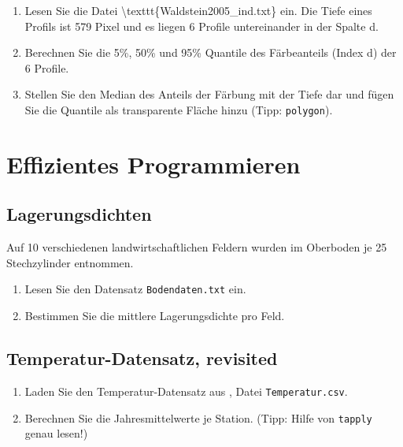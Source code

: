 \documentclass[]{book}
\providecommand{\tightlist}{%
  \setlength{\itemsep}{0pt}\setlength{\parskip}{0pt}}
\begin{document}
\begin{enumerate}
\def\labelenumi{\arabic{enumi}.}
\tightlist
\item
  Lesen Sie die Datei \textbackslash{}texttt\{Waldstein2005\_ind.txt\} ein. Die Tiefe eines Profils ist 579 Pixel und es liegen 6 Profile untereinander in der Spalte d.
\item
  Berechnen Sie die 5\%, 50\% und 95\% Quantile des Färbeanteils (Index d) der 6 Profile.
\item
  Stellen Sie den Median des Anteils der Färbung mit der Tiefe dar und fügen Sie die Quantile als transparente Fläche hinzu (Tipp: \texttt{polygon}).
\end{enumerate}

\hypertarget{effizientes-programmieren}{%
\section{Effizientes Programmieren}\label{effizientes-programmieren}}

\hypertarget{lagerungsdichten}{%
\subsection{Lagerungsdichten}\label{lagerungsdichten}}

Auf 10 verschiedenen landwirtschaftlichen Feldern wurden im Oberboden je 25 Stechzylinder entnommen.

\begin{enumerate}
\def\labelenumi{\arabic{enumi}.}
\tightlist
\item
  Lesen Sie den Datensatz \texttt{Bodendaten.txt} ein.
\item
  Bestimmen Sie die mittlere Lagerungsdichte pro Feld.
\end{enumerate}

\hypertarget{temperatur-datensatz-revisited}{%
\subsection{Temperatur-Datensatz, revisited}\label{temperatur-datensatz-revisited}}

\begin{enumerate}
\def\labelenumi{\arabic{enumi}.}
\tightlist
\item
  Laden Sie den Temperatur-Datensatz aus \citet{Zuur2009a}, Datei \texttt{Temperatur.csv}.
\item
  Berechnen Sie die Jahresmittelwerte je Station. (Tipp: Hilfe von \texttt{tapply} genau lesen!)
\end{enumerate}

\hypertarget{refs}{}


\end{document}
